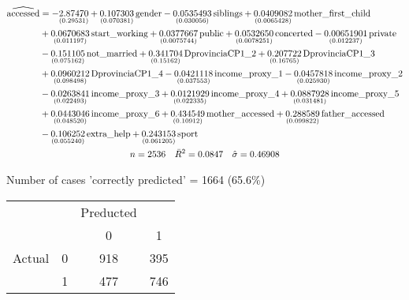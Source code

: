 \documentclass[11pt]{beamer}
\begin{document}
\begin{frame}
\scriptsize

\begin{gather}
\begin{split}
\widehat{\rm accessed} &= 
-\underset{(0.29531)}{2.87470}
+\underset{(0.070381)}{0.107303}\,\mbox{gender}
-\underset{(0.030056)}{0.0535493}\,\mbox{siblings}
+\underset{(0.0065428)}{0.0409082}\,\mbox{mother\_first\_child}\\
& +\underset{(0.011197)}{0.0670683}\,\mbox{start\_working}
+\underset{(0.0075744)}{0.0377667}\,\mbox{public}
+\underset{(0.0078251)}{0.0532650}\,\mbox{concerted}
-\underset{(0.012237)}{0.00651901}\,\mbox{private}\\
& -\underset{(0.075162)}{0.151105}\,\mbox{not\_married}
+\underset{(0.15162)}{0.341704}\,\mbox{DprovinciaCP1\_2}
+\underset{(0.16765)}{0.207722}\,\mbox{DprovinciaCP1\_3}\\
& +\underset{(0.098498)}{0.0960212}\,\mbox{DprovinciaCP1\_4}
-\underset{(0.037553)}{0.0421118}\,\mbox{income\_proxy\_1}
-\underset{(0.025930)}{0.0457818}\,\mbox{income\_proxy\_2}\\
& -\underset{(0.022493)}{0.0263841}\,\mbox{income\_proxy\_3}
+\underset{(0.022335)}{0.0121929}\,\mbox{income\_proxy\_4}
+\underset{(0.031481)}{0.0887928}\,\mbox{income\_proxy\_5}\\
& +\underset{(0.048520)}{0.0443046}\,\mbox{income\_proxy\_6}
+\underset{(0.10912)}{0.434549}\,\mbox{mother\_accessed}
+\underset{(0.099822)}{0.288589}\,\mbox{father\_accessed}\\
& -\underset{(0.055240)}{0.106252}\,\mbox{extra\_help}
+\underset{(0.061205)}{0.243153}\,\mbox{sport}
\end{split}
 \notag \\
n = 2536 \quad \bar{R}^2 = 0.0847 \quad \hat{\sigma} = 0.46908 \notag \\
\end{gather}

\end{frame}

\begin{frame}
\begin{center}

Number of cases 'correctly predicted' = 1664 (65.6\%)

\begin{tabular}{cccc}
&&Preducted&\\
&&0&1\\
Actual&0&918&395\\
&1&477&746\\

\end{tabular}
\end{center}
\end{frame}
\end{document}
